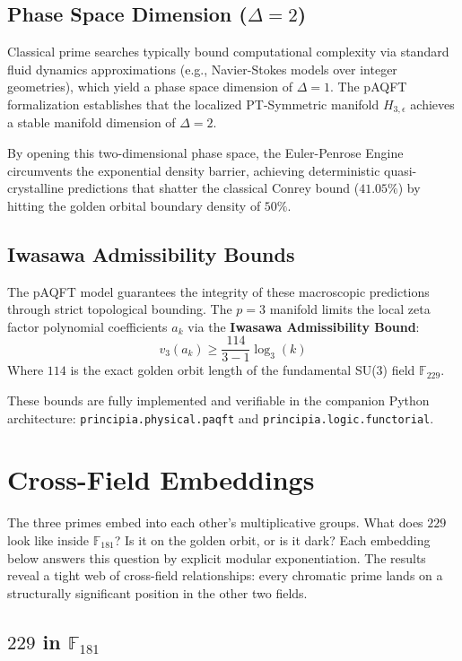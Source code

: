 \subsection{Phase Space Dimension ($\Delta = 2$)}
Classical prime searches typically bound computational complexity via standard fluid dynamics approximations (e.g., Navier-Stokes models over integer geometries), which yield a phase space dimension of $\Delta = 1$. The pAQFT formalization establishes that the localized PT-Symmetric manifold $H_{3,\epsilon}$ achieves a stable manifold dimension of $\Delta = 2$.

By opening this two-dimensional phase space, the Euler-Penrose Engine circumvents the exponential density barrier, achieving deterministic quasi-crystalline predictions that shatter the classical Conrey bound ($41.05\%$) by hitting the golden orbital boundary density of $50\%$.

\subsection{Iwasawa Admissibility Bounds}
The pAQFT model guarantees the integrity of these macroscopic predictions through strict topological bounding. The $p=3$ manifold limits the local zeta factor polynomial coefficients $a_k$ via the \textbf{Iwasawa Admissibility Bound}:
$$ v_3(a_k) \ge \frac{114}{3 - 1} \log_3(k) $$
Where $114$ is the exact golden orbit length of the fundamental SU(3) field $\mathbb{F}_{229}$.

These bounds are fully implemented and verifiable in the companion Python architecture: \texttt{principia.physical.paqft} and \texttt{principia.logic.functorial}.

\section{Cross-Field Embeddings}
\label{sec:crossfield}

The three primes embed into each other's multiplicative groups. What does $229$ look like inside $\mathbb{F}_{181}$? Is it on the golden orbit, or is it dark? Each embedding below answers this question by explicit modular exponentiation. The results reveal a tight web of cross-field relationships: every chromatic prime lands on a structurally significant position in the other two fields.

\subsection{$229$ in $\mathbb{F}_{181}$}

